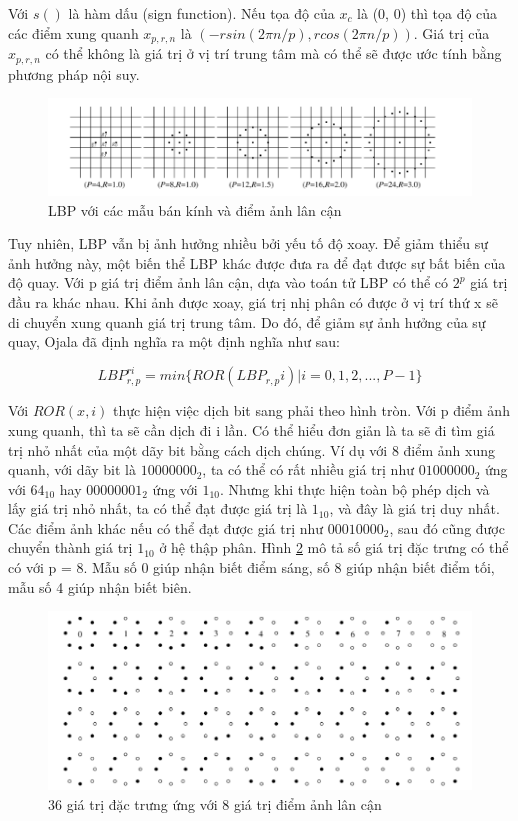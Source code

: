 Với $s()$ là hàm dấu (sign function). Nếu tọa độ của $x_c$ là (0, 0) thì tọa độ của các điểm xung quanh $x_{p, r, n}$ là $(-rsin(2\pi n/p), rcos(2\pi n /p))$. Giá trị của $x_{p,r,n}$ có thể không là giá trị ở vị trí trung tâm mà có thể sẽ được ước tính bằng phương pháp nội suy.
\begin{figure} [h]
	\centering
	\includegraphics[width= 1\linewidth]{figures/lbpCircularSymmetric.png}
	\caption{LBP với các mẫu bán kính và điểm ảnh lân cận\cite{Ojala}}
	\label{fig:lbpCircularSymmetric}
\end{figure} 
Tuy nhiên, LBP vẫn bị ảnh hưởng nhiều bởi yếu tố độ xoay. Để giảm thiểu sự ảnh hưởng này, một biến thể LBP khác được đưa ra để đạt được sự bất biến của độ quay. Với p giá trị điểm ảnh lân cận, dựa vào toán tử LBP có thể có $2^p$ giá trị đầu ra khác nhau. Khi ảnh được xoay, giá trị nhị phân có được ở vị trí thứ x sẽ di chuyển xung quanh giá trị trung tâm. Do đó, để giảm sự ảnh hưởng của sự quay, Ojala \cite{Ojala} đã định nghĩa ra một định nghĩa như sau:

\begin{equation}
	LBP_{r, p}^{ri} = min\{ROR(LBP_{r, p}i) |  i = 0, 1, 2, ..., P-1\}
\end{equation}

Với $ROR(x, i)$ thực hiện việc dịch bit sang phải theo hình tròn. Với p điểm ảnh xung quanh, thì ta sẽ cần dịch đi i lần. Có thể hiểu đơn giản là ta sẽ đi tìm giá trị nhỏ nhất của một dãy bit bằng cách dịch chúng. Ví dụ với 8 điểm ảnh xung quanh, với dãy bit là $10000000_2$, ta có thể có rất nhiều giá trị như $01000000_2$ ứng với $64_{10}$ hay $00000001_2$ ứng với $1_{10}$. Nhưng khi thực hiện toàn bộ phép dịch và lấy giá trị nhỏ nhất, ta có thể đạt được giá trị là $1_{10}$, và đây là giá trị duy nhất. Các điểm ảnh khác nếu có thể đạt được giá trị như $00010000_2$, sau đó cũng được chuyển thành giá trị $1_{10}$ ở hệ thập phân. Hình \ref{fig:lbpRotation} mô tả số giá trị đặc trưng có thể có với p = 8. Mẫu số 0 giúp nhận biết điểm sáng, số 8 giúp nhận biết điểm tối, mẫu số 4 giúp nhận biết biên.  


\begin{figure} [h]
	\centering
	\includegraphics[width= 1\linewidth]{figures/lbpRotation.png}
	\caption{36 giá trị đặc trưng ứng với 8 giá trị điểm ảnh lân cận \cite{Ojala}}
	\label{fig:lbpRotation}
\end{figure} 

